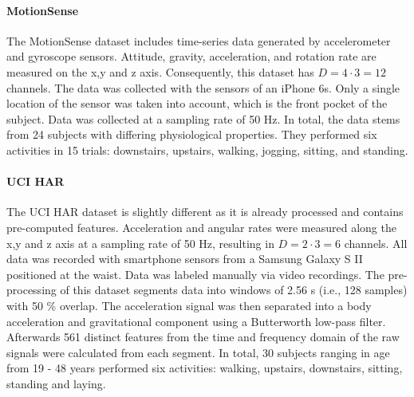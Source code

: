\documentclass[11pt,titlepage,oneside,openany]{book}
\begin{document}
\paragraph{MotionSense}
The MotionSense dataset includes time-series data generated by accelerometer and gyroscope sensors. Attitude, gravity, acceleration, and rotation rate are measured on the x,y and z axis. Consequently, this dataset has $D = 4 \cdot 3 = 12$ channels. The data was collected with the sensors of an iPhone 6s. Only a single location of the sensor was taken into account, which is the front pocket of the subject. Data was collected at a sampling rate of 50 Hz. In total, the data stems from 24 subjects with differing physiological properties. They performed six activities in 15 trials: downstairs, upstairs, walking, jogging, sitting, and standing.

\paragraph{UCI HAR}
The UCI HAR dataset is slightly different as it is already processed and contains pre-computed features. Acceleration and angular rates were measured along the x,y and z axis at a sampling rate of 50 Hz, resulting in $D = 2 \cdot 3 = 6$ channels. All data was recorded with smartphone sensors from a Samsung Galaxy S II positioned at the waist. Data was labeled manually via video recordings. The pre-processing of this dataset segments data into windows of 2.56 s (i.e., 128 samples) with 50 \% overlap. The acceleration signal was then separated into a body acceleration and gravitational component using a Butterworth low-pass filter. Afterwards 561 distinct features from the time and frequency domain of the raw signals were calculated from each segment. In total, 30 subjects ranging in age from 19 - 48 years performed six activities: walking, upstairs, downstairs, sitting, standing and laying.
\end{document}
